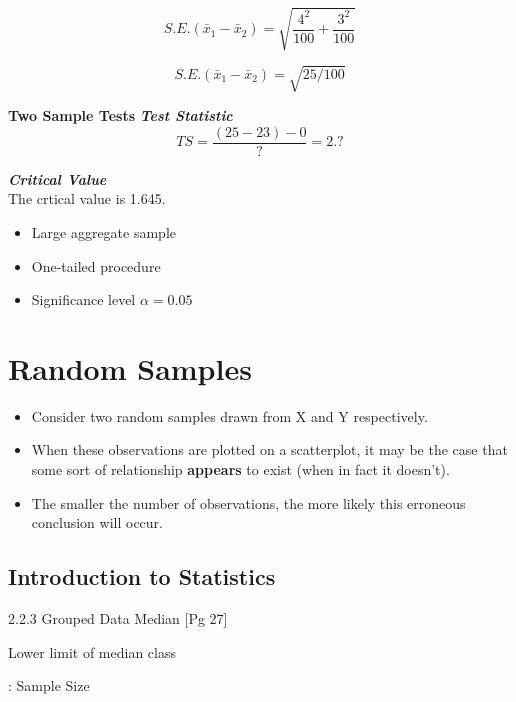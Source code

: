 \documentclass[]{report}
\begin{document}
\[ S.E.(\bar{x}_1 - \bar{x}_2)  = \sqrt{\frac{4^2}{100} + \frac{3^2}{100}}\]

\[ S.E.(\bar{x}_1 - \bar{x}_2)  =\sqrt{ 25/100}\]



\textbf{Two Sample Tests}
\noindent \textbf{\emph{Test Statistic}}
\[TS = \frac{(25-23) - 0}{?} = 2.?\]

\noindent \textbf{\emph{Critical Value}}\\
The crtical value is 1.645.
\begin{itemize}
\item Large aggregate sample
\item One-tailed procedure
\item Significance level $\alpha=0.05$
\end{itemize}












\section{Random Samples}
\begin{itemize}
\item Consider two random samples drawn from X and Y respectively.
\item When these observations are plotted on a scatterplot, it
may be the case that some sort of relationship \textbf{appears} to exist (when in fact it doesn't).
\item The smaller the number of observations, the more likely this erroneous conclusion will occur.
\end{itemize}




\subsection{Introduction to Statistics}

2.2.3 Grouped Data Median  [Pg 27]





Lower limit of median class

:      Sample Size
\end{document}
